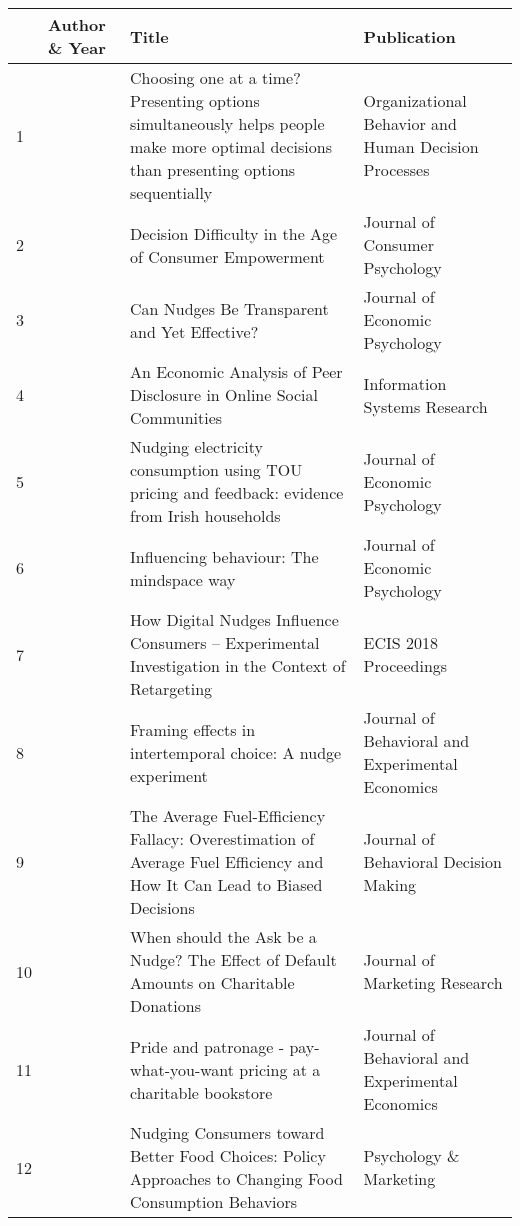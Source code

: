 \begin{table}[h!]
\small
\begin{tabular}{|l|p{}|p{}|p{}|}
\hline
 & \textbf{Author \& Year} & \textbf{Title} & \textbf{Publication} \\ \hline
 1 & \cite{basu_choosing_2017} & Choosing one at a time? Presenting options simultaneously helps people make more optimal decisions than presenting options sequentially & Organizational Behavior and Human Decision Processes \\ \hline
2 & \cite{broniarczyk_decision_2014} & Decision Difficulty in the Age of Consumer Empowerment & Journal of Consumer Psychology \\ \hline
3 & \cite{bruns_can_2018} & Can Nudges Be Transparent and Yet Effective? & Journal of Economic Psychology \\ \hline
4 & \cite{cao_economic_2018} & An Economic Analysis of Peer Disclosure in Online Social Communities & Information Systems Research \\ \hline
5 & \cite{cosmo_nudging_2017} & Nudging electricity consumption using TOU pricing and feedback: evidence from Irish households & Journal of Economic Psychology \\ \hline
6 & \cite{dolan_influencing_2012} & Influencing behaviour: The mindspace way & Journal of Economic Psychology \\ \hline
7 & \cite{eigenbrod_how_2018} & How Digital Nudges Influence Consumers – Experimental Investigation in the Context of Retargeting & ECIS 2018 Proceedings \\ \hline
8 & \cite{faralla_framing_2017} & Framing effects in intertemporal choice: A nudge experiment & Journal of Behavioral and Experimental Economics \\ \hline
9 & \cite{gamliel_average_2017} & The Average Fuel-Efficiency Fallacy: Overestimation of Average Fuel Efficiency and How It Can Lead to Biased Decisions & Journal of Behavioral Decision Making \\ \hline
10 & \cite{goswami_when_2016} & When should the Ask be a Nudge? The Effect of Default Amounts on Charitable Donations & Journal of Marketing Research \\ \hline
11 & \cite{gravert_pride_2017} & Pride and patronage - pay-what-you-want pricing at a charitable bookstore & Journal of Behavioral and Experimental Economics \\ \hline
12 & \cite{guthrie_nudging_2015} & Nudging Consumers toward Better Food Choices: Policy Approaches to Changing Food Consumption Behaviors & Psychology \& Marketing \\ \hline

\end{tabular}
\end{table}
